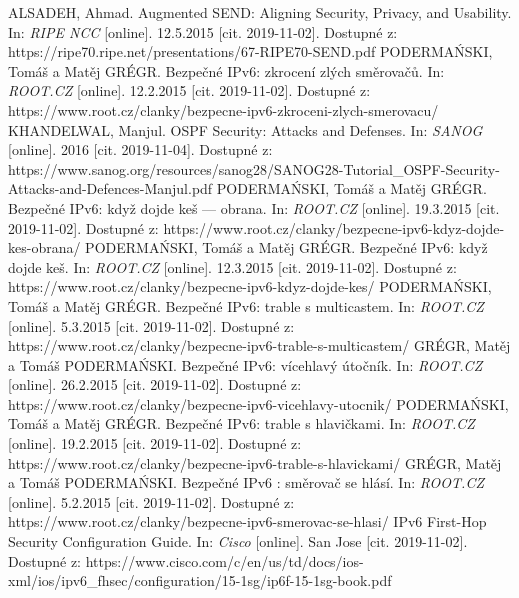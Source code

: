 

\begin{literatura}{99}
	
ALSADEH, Ahmad. Augmented SEND: Aligning Security, Privacy, and Usability. In: \textit{RIPE NCC} [online]. 12.5.2015 [cit. 2019-11-02]. Dostupné z: https://ripe70.ripe.net/presentations/67-RIPE70-SEND.pdf
PODERMAŃSKI, Tomáš a Matěj GRÉGR. Bezpečné IPv6: zkrocení zlých směrovačů. In: \textit{ROOT.CZ} [online]. 12.2.2015 [cit. 2019-11-02]. Dostupné z: https://www.root.cz/clanky/bezpecne-ipv6-zkroceni-zlych-smerovacu/
KHANDELWAL, Manjul. OSPF Security: Attacks and Defenses. In: \textit{SANOG} [online]. 2016 [cit. 2019-11-04]. Dostupné z: https://www.sanog.org/resources/sanog28/SANOG28-Tutorial\_OSPF-Security-Attacks-and-Defences-Manjul.pdf
PODERMAŃSKI, Tomáš a Matěj GRÉGR. Bezpečné IPv6: když dojde keš --- obrana. In: \textit{ROOT.CZ} [online]. 19.3.2015 [cit. 2019-11-02]. Dostupné z: https://www.root.cz/clanky/bezpecne-ipv6-kdyz-dojde-kes-obrana/
PODERMAŃSKI, Tomáš a Matěj GRÉGR. Bezpečné IPv6: když dojde keš. In: \textit{ROOT.CZ} [online]. 12.3.2015 [cit. 2019-11-02]. Dostupné z: https://www.root.cz/clanky/bezpecne-ipv6-kdyz-dojde-kes/
PODERMAŃSKI, Tomáš a Matěj GRÉGR. Bezpečné IPv6: trable s multicastem. In: \textit{ROOT.CZ} [online]. 5.3.2015 [cit. 2019-11-02]. Dostupné z: https://www.root.cz/clanky/bezpecne-ipv6-trable-s-multicastem/
GRÉGR, Matěj a Tomáš PODERMAŃSKI. Bezpečné IPv6: vícehlavý útočník. In: \textit{ROOT.CZ} [online]. 26.2.2015 [cit. 2019-11-02]. Dostupné z: https://www.root.cz/clanky/bezpecne-ipv6-vicehlavy-utocnik/
PODERMAŃSKI, Tomáš a Matěj GRÉGR. Bezpečné IPv6: trable s hlavičkami. In: \textit{ROOT.CZ} [online]. 19.2.2015 [cit. 2019-11-02]. Dostupné z: https://www.root.cz/clanky/bezpecne-ipv6-trable-s-hlavickami/
GRÉGR, Matěj a Tomáš PODERMAŃSKI. Bezpečné IPv6 : směrovač se hlásí. In: \textit{ROOT.CZ} [online]. 5.2.2015 [cit. 2019-11-02]. Dostupné z: https://www.root.cz/clanky/bezpecne-ipv6-smerovac-se-hlasi/
IPv6 First-Hop Security Configuration Guide. In: \textit{Cisco} [online]. San Jose [cit. 2019-11-02]. Dostupné z: https://www.cisco.com/c/en/us/td/docs/ios-xml/ios/ipv6\_fhsec/configuration/15-1sg/ip6f-15-1sg-book.pdf

\end{literatura}
